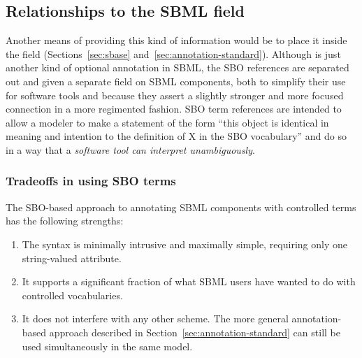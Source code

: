 



\subsection{Relationships to the SBML  field}

Another means of providing this kind of information would be to
place it inside the  field
(Sections~\ref{sec:sbase} and~\ref{sec:annotation-standard}).
Although  is just another kind of optional
annotation in SBML, the SBO references are separated out and given
a separate field on SBML components, both to simplify their use
for software tools and because they assert a slightly stronger and
more focused connection in a more regimented fashion.  SBO term
references are intended to allow a modeler to make a statement of
the form ``this object is identical in meaning and intention to
the definition of X in the SBO vocabulary'' and do so in a way
that a \emph{software tool can interpret unambiguously}.


\subsubsection{Tradeoffs in using SBO terms}

The SBO-based approach to annotating SBML components with
controlled terms has the following strengths:
\begin{enumerate}

\item The syntax is minimally intrusive and maximally simple,
  requiring only one string-valued attribute.

\item It supports a significant fraction of what SBML users have wanted
  to do with controlled vocabularies.

\item It does not interfere with any other scheme.  The more
  general annotation-based approach described in
  Section~\ref{sec:annotation-standard} can still be used
  simultaneously in the same model.

\end{enumerate}

